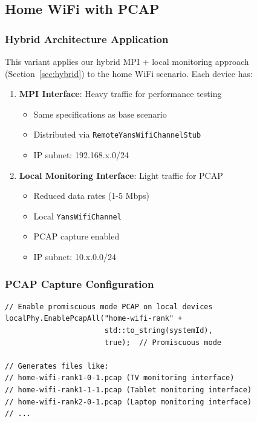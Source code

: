 \subsection{Home WiFi with PCAP}

\subsubsection{Hybrid Architecture Application}

This variant applies our hybrid MPI + local monitoring approach (Section~\ref{sec:hybrid}) to the home WiFi scenario. Each device has:

\begin{enumerate}
    \item \textbf{MPI Interface}: Heavy traffic for performance testing
    \begin{itemize}
        \item Same specifications as base scenario
        \item Distributed via \texttt{RemoteYansWifiChannelStub}
        \item IP subnet: 192.168.x.0/24
    \end{itemize}
    
    \item \textbf{Local Monitoring Interface}: Light traffic for PCAP
    \begin{itemize}
        \item Reduced data rates (1-5 Mbps)
        \item Local \texttt{YansWifiChannel}
        \item PCAP capture enabled
        \item IP subnet: 10.x.0.0/24
    \end{itemize}
\end{enumerate}

\subsubsection{PCAP Capture Configuration}

\begin{lstlisting}[style=cpp, caption={PCAP enable on monitoring interfaces}]
// Enable promiscuous mode PCAP on local devices
localPhy.EnablePcapAll("home-wifi-rank" + 
                       std::to_string(systemId), 
                       true);  // Promiscuous mode

// Generates files like:
// home-wifi-rank1-0-1.pcap (TV monitoring interface)
// home-wifi-rank1-1-1.pcap (Tablet monitoring interface)
// home-wifi-rank2-0-1.pcap (Laptop monitoring interface)
// ...
\end{lstlisting}

